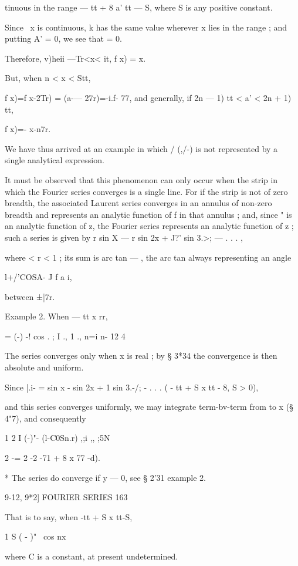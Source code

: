 tinuous in the range — tt + 8 a' tt — S, where S is any positive
constant.

Since \ x is continuous, k has the same value wherever x lies in the
range ; and putting A' = 0, we see that = 0.

Therefore, v)heii —Tr<x< it, f x) = x.

But, when n < x < Stt,

f x)=f x-2Tr) = (a-— 27r)=-i.f- 77, and generally, if 2n — 1) tt < a'
< 2n + 1) tt,

f x)=- x-n7r.

We have thus arrived at an example in which / (,/-) is not represented
by a single analytical expression.

It must be observed that this phenomenon can only occur when the strip
in which the Fourier series converges is a single line. For if the
strip is not of zero breadth, the associated Laurent series converges
in an annulus of non-zero breadth and represents an analytic function
of f in that annulus ; and, since " is an analytic function of z, the
Fourier series represents an analytic function of z ; such a series is
given by r sin X — r sin 2x + J?' sin 3.>; — . . . ,

where < r < 1 ; its sum is arc tan — , the arc tan always representing
an angle

l+/'COSA- J f a i,

between ±|7r.

Example 2. When — tt x rr,

= (-) -! cos . ; I ., 1 ., n=i n- 12 4

The series converges only when x is real ; by § 3*34 the convergence
is then absolute and uniform.

Since |.i- = sin x - sin 2x + 1 sin 3.-/; - . . . ( - tt + S x tt - 8,
S > 0),

and this series converges uniformly, we may integrate term-bv-term
from to x (§ 4"7), and consequently

1 2 I (-)"- (l-C0Sn.r) ,;i ,, ;5N

2 -= 2 -2 -71 + 8 x 77 -d).

* The series do converge if y — 0, see § 2'31 example 2.



9-12, 9*2] FOURIER SERIES 163

That is to say, when -tt + S x tt-S,

  1 S ( - )"~ cos nx

where C is a constant, at present undetermined.

